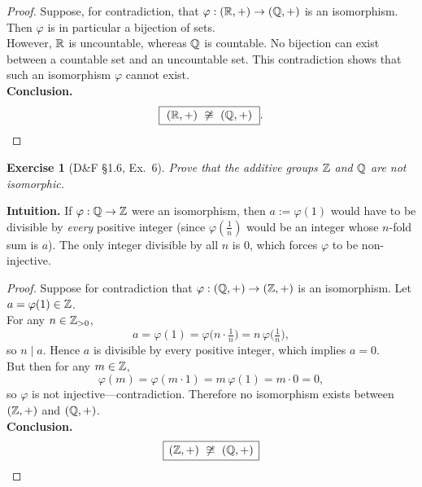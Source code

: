 \documentclass[12pt]{article}
\newtheorem{exercise}[theorem]{Exercise}
\theoremstyle{definition}
\begin{document}
\dotfill

\begin{proof}
\noindent Suppose, for contradiction, that $\varphi:(\Bbb R,+)\to(\Bbb Q,+)$ is an isomorphism. Then $\varphi$ is in particular a bijection of sets.\\

\noindent However, $\Bbb R$ is uncountable, whereas $\Bbb Q$ is countable. No bijection can exist between a countable set and an uncountable set. This contradiction shows that such an isomorphism $\varphi$ cannot exist.\\

\noindent\textbf{Conclusion.}
\[
\boxed{\ (\Bbb R,+)\ \not\cong\ (\Bbb Q,+)\ }.
\]
\end{proof}

\newpage

\begin{exercise}[D\&F §1.6, Ex.~6]
Prove that the additive groups $\Bbb Z$ and $\Bbb Q$ are not isomorphic.
\end{exercise}

\dotfill

\noindent\textbf{Intuition.}
If $\varphi:\Bbb Q\to\Bbb Z$ were an isomorphism, then $a:=\varphi(1)$ would have to be divisible by \emph{every} positive integer (since $\varphi(\tfrac1n)$ would be an integer whose $n$-fold sum is $a$). The only integer divisible by all $n$ is $0$, which forces $\varphi$ to be non-injective.\\

\dotfill

\begin{proof}
\noindent Suppose for contradiction that $\varphi:(\Bbb Q,+)\to(\Bbb Z,+)$ is an isomorphism. Let $a=\varphi(1)\in\Bbb Z$.\\

\noindent For any $n\in\Bbb Z_{>0}$,
\[
a=\varphi(1)=\varphi\!\Big(n\cdot \tfrac1n\Big)=n\,\varphi\!\Big(\tfrac1n\Big),
\]
so $n\mid a$. Hence $a$ is divisible by every positive integer, which implies $a=0$.\\

\noindent But then for any $m\in\Bbb Z$,
\[
\varphi(m)=\varphi(m\cdot 1)=m\,\varphi(1)=m\cdot 0=0,
\]
so $\varphi$ is not injective—contradiction. Therefore no isomorphism exists between $(\Bbb Z,+)$ and $(\Bbb Q,+)$.\\

\noindent\textbf{Conclusion.}
\[
\boxed{\,(\Bbb Z,+)\ \not\cong\ (\Bbb Q,+)\,}
\]
\end{proof}
\end{document}
